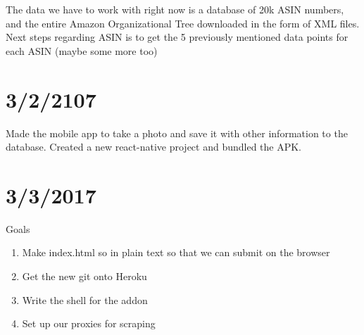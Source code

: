 \documentclass[12pt]{article}
\begin{document}
The data we have to work with right now is a database of 20k ASIN numbers, and the entire Amazon Organizational Tree downloaded in the form of XML files. Next steps regarding ASIN is to get the 5 previously mentioned data points for each ASIN (maybe some more too)

\section*{3/2/2107}
Made the mobile app to take a photo and save it with other information to the database. Created a new react-native project and bundled the APK.

\section*{3/3/2017}
Goals 
\begin{enumerate}
	\item Make index.html so in plain text so that we can submit on the browser
	\item Get the new git onto Heroku
	\item Write the shell for the addon 
	\item Set up our proxies for scraping 
\end{enumerate}
\end{document}

